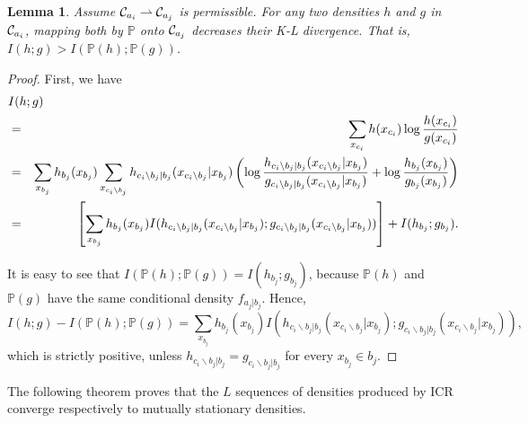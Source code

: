 \documentclass[12pt,a4paper]{article}
\newtheorem{lemma}[definition]{Lemma}
\begin{document}
\begin{lemma}\label{lem:shorten}
Assume ${\cal C}_{a_i} \rightharpoonup {\cal C}_{a_j}$ is permissible.
For any two densities $h$ and $g$ in ${\cal C}_{a_i}$,
mapping both by ${\mathbb P}$ onto ${\cal C}_{a_j}$ decreases their K-L divergence.
That is, $I(h;g)>I({\mathbb P}(h);{\mathbb P}(g))$.
\end{lemma}
\begin{proof}
First, we have
\begin{eqnarray*}
\lefteqn{I(h;g)}\\
&=&\sum_{x_{c_i}}h(x_{c_i})\log\frac {h(x_{c_i})}{g(x_{c_i})}\\
&=&\sum_{x_{b_j}}h_{b_j}(x_{b_j})\sum_{x_{{c_i}\backslash b_j}}h_{{c_i}\backslash b_j|b_j}(x_{{c_i}\backslash b_j}|x_{b_j})\left(\log\frac {h_{{c_i}\backslash b_j|b_j}(x_{{c_i}\backslash b_j}|x_{b_j})}{g_{{c_i}\backslash b_j|b_j}(x_{{c_i}\backslash b_j}|x_{b_j})}+\log\frac{h_{b_j}(x_{b_j})}{g_{b_j}(x_{b_j})}\right)\\
&=&\left[\sum_{x_{b_j}}h_{b_j}(x_{b_j})I(h_{{c_i}\backslash b_j|b_j}(x_{{c_i}\backslash b_j} |x_{b_j});g_{{c_i}\backslash b_j|b_j}(x_{{c_i}\backslash b_j} |x_{b_j}))\right] +I(h_{b_j};g_{b_j}).
\end{eqnarray*}

It is easy to see that
$I({\mathbb P}(h);{\mathbb P}(g))=I(h_{b_j};g_{b_j})$, because
${\mathbb P}(h)$ and ${\mathbb P}(g)$ have the same conditional density $f_{a_j|b_j}$.
Hence,
\[
I(h;g)-I({\mathbb P}(h);{\mathbb P}(g))
=\sum_{x_{b_j}}h_{b_j}(x_{b_j})I(h_{{c_i}\backslash b_j|b_j}(x_{{c_i}\backslash b_j} |x_{b_j});g_{{c_i}\backslash b_j|b_j}(x_{{c_i}\backslash b_j} |x_{b_j})),
\]
which is strictly positive, unless $h_{{c_i}\backslash b_j|b_j}=g_{{c_i}\backslash b_j|b_j}$ for every $x_{b_j} \in b_j $.
\end{proof}

The following theorem proves that  the $L$ sequences
of  densities produced by ICR converge respectively to
mutually stationary densities.
\end{document}
